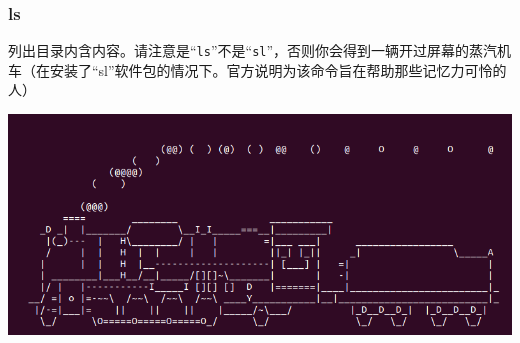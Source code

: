 \subsubsection{ls}
\cite{manls}\par
列出目录内含内容。请注意是“\verb|ls|”不是“\verb|sl|”，否则你会得到一辆开过屏幕的蒸汽机车（在安装了“sl”软件包的情况下。官方说明为该命令旨在帮助那些记忆力可怜的人）
\begin{center}
	\includegraphics[scale=2.2]{pic/sl}
\end{center} \par
